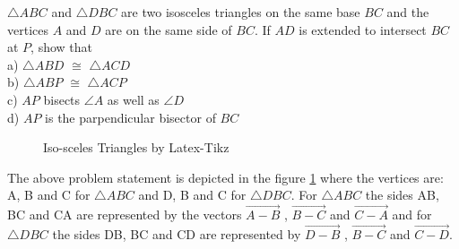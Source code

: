 
$\triangle ABC$ and $\triangle DBC$ are two isosceles triangles on the same base $BC$ and the vertices $A$ and $D$ are on the same side of $BC$. If $AD$ is extended to intersect $BC$ at $P$, show that \\
a) $\triangle ABD$ $\cong$ $\triangle ACD$ \\
b) $\triangle ABP$ $\cong$ $\triangle ACP$ \\
c) $AP$ bisects $\angle A$ as well as $\angle D$\\
d) $AP$ is the parpendicular bisector of $BC$

\begin{figure}[!ht]
\centering
\resizebox{\columnwidth}{!}{}
\caption{Iso-sceles Triangles by Latex-Tikz}
\label{eq:solutions/1/33/fig:iso_scelen}	
\end{figure}

The above problem statement is depicted in the figure \ref{eq:solutions/1/33/fig:iso_scelen} where the vertices are: A, B and C for $\triangle ABC$ and D, B and C for $\triangle DBC$. For $\triangle ABC$ the sides AB, BC and CA are represented by the vectors $\vec{A-B}$ , $\vec{B-C}$ and $\vec{C-A}$ and for $\triangle DBC$ the sides DB, BC and CD are represented by $\vec{D-B}$ , $\vec{B-C}$ and $\vec{C-D}$.

